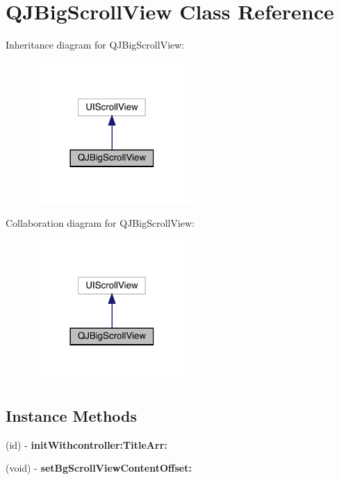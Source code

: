 \hypertarget{interface_q_j_big_scroll_view}{}\section{Q\+J\+Big\+Scroll\+View Class Reference}
\label{interface_q_j_big_scroll_view}


Inheritance diagram for Q\+J\+Big\+Scroll\+View\+:\nopagebreak
\begin{figure}[H]
\begin{center}
\leavevmode
\includegraphics[width=170pt]{interface_q_j_big_scroll_view__inherit__graph}
\end{center}
\end{figure}


Collaboration diagram for Q\+J\+Big\+Scroll\+View\+:\nopagebreak
\begin{figure}[H]
\begin{center}
\leavevmode
\includegraphics[width=170pt]{interface_q_j_big_scroll_view__coll__graph}
\end{center}
\end{figure}
\subsection*{Instance Methods}
\begin{DoxyCompactItemize}
\item 
\mbox{\label{interface_q_j_big_scroll_view_aefbcc82d558f6da7a853c2f0fd410434}} 
(id) -\/ {\bfseries init\+Withcontroller\+:\+Title\+Arr\+:}
\item 
\mbox{\label{interface_q_j_big_scroll_view_a0f54e221ba40ee8b9e51a072af4141fd}} 
(void) -\/ {\bfseries set\+Bg\+Scroll\+View\+Content\+Offset\+:}
\end{DoxyCompactItemize}

